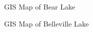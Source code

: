 

\begin{figure}[t]
\centerline{%
  }
\caption{GIS Map of Bear Lake}
\end{figure}

\begin{figure}[t]
\centerline{%
  }
\caption{GIS Map of Belleville Lake}
\end{figure}


